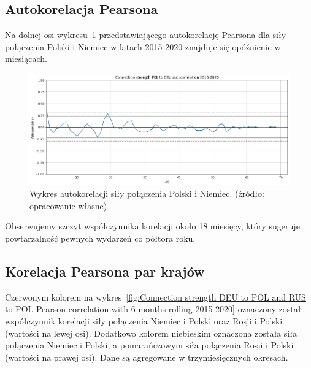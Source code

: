 \documentclass[11pt]{report}
\begin{document}
    \subsection{Autokorelacja Pearsona}
    Na dolnej osi wykresu~\ref{fig:connection-strength-pol-to-deu-autocorrelation-2015-2020} przedstawiającego
    autokorelację Pearsona dla siły połączenia Polski i Niemiec w latach 2015-2020 znajduje się opóźnienie w miesiącach.

    \begin{figure}[!ht]
        \centering
        \includegraphics[width=\linewidth]{../spade_proto/figures/autocorrelation/Connection strength POL to DEU autocorrelation 2015-2020.png}
        \caption{Wykres autokorelacji siły połączenia Polski i Niemiec. (źródło: opracowanie własne)}
        \label{fig:connection-strength-pol-to-deu-autocorrelation-2015-2020}
    \end{figure}

    Obserwujemy szczyt współczynnika korelacji około 18 miesięcy, który sugeruje powtarzalność pewnych wydarzeń co półtora roku.

    \subsection{Korelacja Pearsona par krajów}
    Czerwonym kolorem na wykres~\ref{fig:Connection strength DEU to POL and RUS to POL Pearson correlation with 6 months rolling 2015-2020}
    oznaczony został współczynnik korelacji siły połączenia Niemiec i Polski oraz Rosji i Polski (wartości na lewej osi).
    Dodatkowo kolorem niebieskim oznaczona została siła połączenia Niemiec i Polski, a pomarańczowym siła połączenia Rosji i Polski (wartości na prawej osi).
    Dane są agregowane w trzymiesięcznych okresach.
\end{document}
